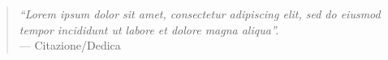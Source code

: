 \newpage
\thispagestyle{empty}
\vspace*{\fill}
\begin{quote}
\centering
\emph{``Lorem ipsum dolor sit amet, consectetur adipiscing elit, sed do eiusmod tempor incididunt ut labore et dolore magna aliqua''.}\\
\vspace*{2ex}
--- Citazione/Dedica
\end{quote}
\vspace*{\fill}